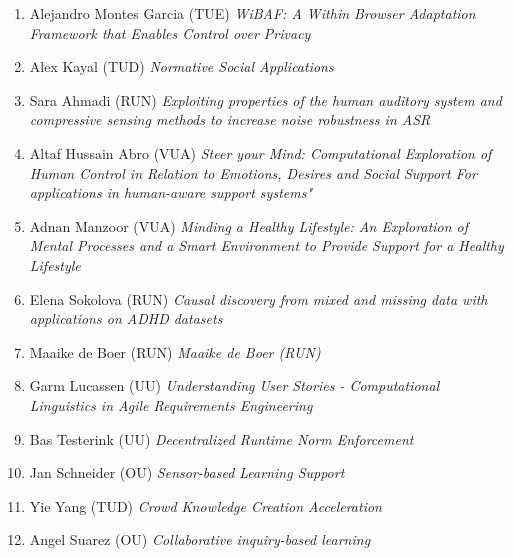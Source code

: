 \begin{multicols}{2}
\begin{scriptsize}
\begin{enumerate}[leftmargin=*,noitemsep,topsep=0pt,parsep=1pt,partopsep=0pt]
{}\item Alejandro Montes Garcia (TUE) \textit{WiBAF: A Within Browser Adaptation Framework that Enables Control over Privacy
}\item Alex Kayal (TUD) \textit{Normative Social Applications
}\item Sara Ahmadi (RUN) \textit{Exploiting properties of the human auditory system and compressive sensing methods to increase noise robustness in ASR
}\item Altaf Hussain Abro (VUA) \textit{Steer your Mind: Computational Exploration of Human Control in Relation to Emotions, Desires and Social Support For applications in human-aware support systems"
}\item Adnan Manzoor (VUA) \textit{Minding a Healthy Lifestyle: An Exploration of Mental Processes and a Smart Environment to Provide Support for a Healthy Lifestyle
}\item Elena Sokolova (RUN) \textit{Causal discovery from mixed and missing data with applications on ADHD  datasets
}\item Maaike de Boer (RUN) \textit{Maaike de Boer (RUN)
}\item Garm Lucassen (UU) \textit{Understanding User Stories - Computational Linguistics in Agile Requirements Engineering
}\item Bas Testerink (UU) \textit{Decentralized Runtime Norm Enforcement
}\item Jan Schneider (OU) \textit{Sensor-based Learning Support
}\item Yie Yang (TUD) \textit{Crowd Knowledge Creation Acceleration
}\item Angel Suarez (OU) \textit{Collaborative inquiry-based learning}
\end{enumerate}


\end{scriptsize}
\end{multicols}
